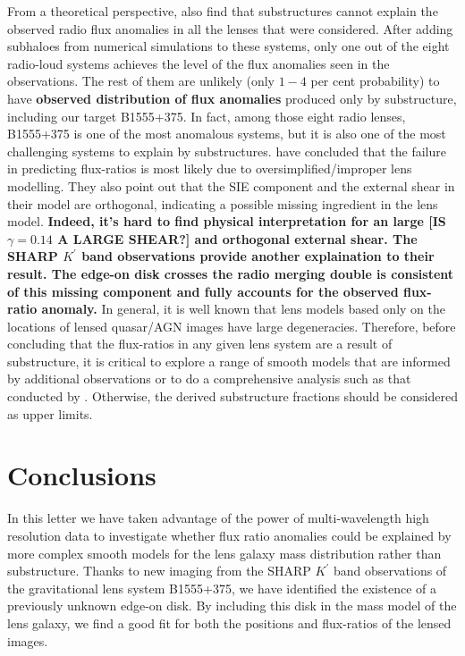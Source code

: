 \documentclass[useAMS,usenatbib]{mnras}
\begin{document}
From a theoretical perspective, \citet{Xu14} also find that substructures
cannot explain the observed radio flux anomalies in all the lenses
that were considered. After adding subhaloes from numerical simulations
to these systems, only one out of the eight radio-loud systems
achieves the level of the flux anomalies seen in the observations.  The rest of
them are unlikely (only $1 - 4$ per cent probability) to have \textbf{observed distribution of flux
anomalies} produced only by substructure, including our target B1555+375.
In fact, among those eight radio lenses, B1555+375 is one of the most
anomalous systems, but it is also one of the most challenging systems
to explain by substructures. \citet{Xu14} have concluded that the failure in
predicting flux-ratios is most likely due to oversimplified/improper lens
modelling. They also point out that the SIE component and the external
shear in their model are orthogonal, indicating a possible missing
ingredient in the lens model.
\textbf{Indeed, it's hard to find physical interpretation for an large [IS $\gamma = 0.14$ A LARGE SHEAR?] and orthogonal external shear.
The SHARP $K^{\prime}$ band observations provide another explaination to their result. The edge-on disk crosses the
radio merging double is consistent of this missing component and fully accounts for the observed flux-ratio anomaly.} 
In general, it is well known  \citep[e.g,][]{Ka91} that lens models based only on the locations of lensed
quasar/AGN images have large degeneracies. Therefore, before
concluding that the flux-ratios in any given lens system are a result
of substructure, it is critical to explore a range of smooth models
that are informed by additional observations or to do a comprehensive
analysis such as that conducted by \citet{Xu14}. Otherwise, the derived
substructure fractions should be considered as upper limits.
 

\section{Conclusions}
In this letter we have taken advantage of the power of
multi-wavelength high resolution data to investigate whether flux
ratio anomalies could be explained by more complex smooth models for
the lens galaxy mass distribution rather than substructure. Thanks to
new imaging from the SHARP $K^{\prime}$ band observations of the
gravitational lens system B1555+375, we have identified the existence
of a previously unknown edge-on disk. By including this disk in the
mass model of the lens galaxy, we find a good fit for both the
positions and flux-ratios of the lensed images. 
\end{document}
